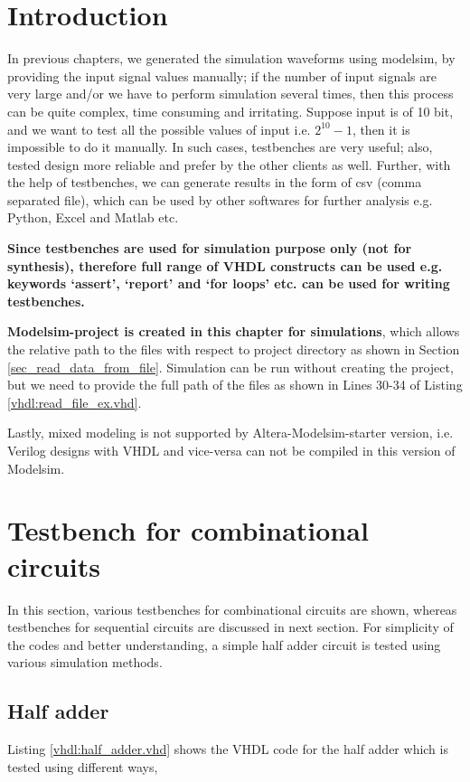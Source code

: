 \section{Introduction}

In previous chapters, we generated the simulation waveforms using modelsim, by providing the input signal values manually; if the number of input signals are very large and/or we have to perform simulation several times, then this process can be quite complex, time consuming and irritating. Suppose input is of 10 bit, and we want to test all the possible values of input i.e. $2^{10}-1$, then it is impossible to do it manually. In such cases, testbenches are very useful; also, tested design more reliable and prefer by the other clients as well. Further, with the help of testbenches, we can generate results in the form of csv (comma separated file), which can be used by other softwares for further analysis e.g. Python, Excel and Matlab etc.  

\textbf{Since testbenches are used for simulation purpose only (not for synthesis), therefore full range of VHDL constructs can be used e.g. keywords `assert', `report' and `for loops' etc. can be used for writing testbenches.}

\textbf{Modelsim-project is created in this chapter for simulations}, which allows the relative path to the files with respect to project directory as shown in Section \ref{sec_read_data_from_file}. Simulation can be run without creating the project, but we need to provide the full path of the files as shown in Lines 30-34 of Listing \ref{vhdl:read_file_ex.vhd}. 

Lastly, mixed modeling is not supported by Altera-Modelsim-starter version, i.e. Verilog designs with VHDL and vice-versa can not be compiled in this version of Modelsim. 

\section{Testbench for combinational circuits}

In this section, various testbenches for combinational circuits are shown, whereas testbenches for sequential circuits are discussed in next section. For simplicity of the codes and better understanding, a simple half adder circuit is tested using various simulation methods. 

\subsection{Half adder}
Listing \ref{vhdl:half_adder.vhd} shows the VHDL code for the half adder which is tested using different ways, 

